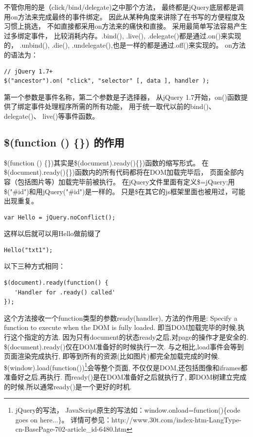 \documentclass{book}
\begin{document}
不管你用的是（click/bind/delegate)之中那个方法，
最终都是jQuery底层都是调用on方法来完成最终的事件绑定。
因此从某种角度来讲除了在书写的方便程度及习惯上挑选，
不如直接都采用on方法来的痛快和直接。
采用最简单写法容易产生过多绑定事件，
比较消耗内存。.bind(), .live(), .delegate()都是通过.on()来实现的，
.unbind(), .die(), .undelegate(),也是一样的都是通过.off()来实现的。
on方法的语法为：

\begin{lstlisting}[language=VBScript]
// jQuery 1.7+
$("ancestor").on( "click", "selector" [, data ], handler );
\end{lstlisting}

第一个参数是事件名称，第二个参数是子选择器，
从jQuery 1.7开始，on()函数提供了绑定事件处理程序所需的所有功能，
用于统一取代以前的bind()、 delegate()、 live()等事件函数。

\subsection{\$(function () \{\}) 的作用}

\$(function () \{\})其实是\$(document).ready()\{\})函数的缩写形式。
在\$(document).ready()\{\})函数内的所有代码都将在DOM加载完毕后，
页面全部内容（包括图片等）加载完毕前被执行。
在jQuery文件里面有定义\$=jQuery;用\$("\#id")和用jQuery("\#id")是一样的。
只是\$在其它的js框架里面也被用过，可能出现重复。

\begin{lstlisting}[language=VBScript]
var Hello = jQuery.noConflict();
\end{lstlisting}

这样以后就可以用Hello做前缀了

\begin{lstlisting}[language=VBScript]
Hello("txt1");
\end{lstlisting}

以下三种方式相同：

\begin{lstlisting}[language=VBScript]
$(document).ready(function() {  
   'Handler for .ready() called' 
});  
\end{lstlisting}

这个方法接收一个function类型的参数ready(handler), 
方法的作用是: Specify a function to execute when the DOM is fully loaded.
即当DOM加载完毕的时候,执行这个指定的方法.
因为只有document的状态ready之后,对page的操作才是安全的.
\$(document).ready()仅在DOM准备好的时候执行一次.
与之相比,load事件会等到页面渲染完成执行,
即等到所有的资源(比如图片)都完全加载完成的时候.
\$(window).load(function(){})\footnote{jQuery的写法，
JavaScript原生的写法如：window.onload=function()\{code goes on here...\}。
详情可参见：http://www.30t.com/index-htm-LangType-cn-BasePage-702-article\_id-6480.htm}会等整个页面,
不仅仅是DOM,还包括图像和iframes都准备好之后,再执行.
而ready()是在DOM准备好之后就执行了,
即DOM树建立完成的时候.所以通常ready()是一个更好的时机.
\end{document}
